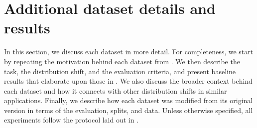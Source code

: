 \section{Additional dataset details and results}\label{sec:app_datasets}

In this section, we discuss each \Wilds dataset in more detail. For completeness, we start by repeating the motivation behind each dataset from .
We then describe the task, the distribution shift, and the evaluation criteria, and present baseline results that elaborate upon those in
.
We also discuss the broader context behind each dataset and how it connects with other distribution shifts in similar applications.
Finally, we describe how each dataset was modified from its original
version in terms of the evaluation, splits, and data.
Unless otherwise specified, all experiments follow the protocol laid out in .
